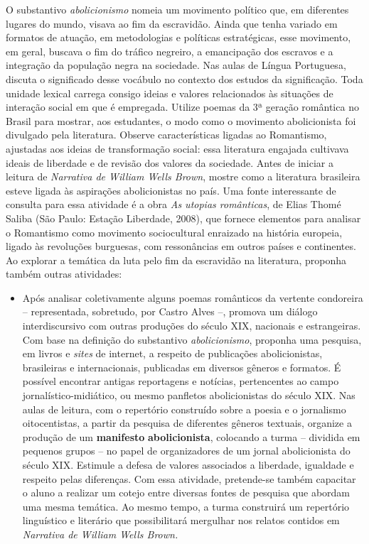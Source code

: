 \documentclass[11pt]{extarticle}
\begin{document}
O substantivo \emph{abolicionismo} nomeia um movimento
político que, em diferentes lugares do mundo, visava ao fim da
escravidão. Ainda que tenha variado em formatos de atuação, em
metodologias e políticas estratégicas, esse movimento, em geral, buscava
o fim do tráfico negreiro, a emancipação dos escravos e a integração da
população negra na sociedade. Nas aulas de Língua Portuguesa, discuta o
significado desse vocábulo no contexto dos estudos da significação. Toda
unidade lexical carrega consigo ideias e valores relacionados às
situações de interação social em que é empregada. Utilize poemas da 3ª
geração romântica no Brasil para mostrar, aos estudantes, o modo como o
movimento abolicionista foi divulgado pela literatura. Observe
características ligadas ao Romantismo, ajustadas aos ideias de
transformação social: essa literatura engajada cultivava ideais de
liberdade e de revisão dos valores da sociedade. Antes de iniciar a
leitura de \emph{Narrativa de William Wells Brown}, mostre como a
literatura brasileira esteve ligada às aspirações abolicionistas no
país. Uma fonte interessante de consulta para essa atividade é a obra
\emph{As utopias românticas}, de Elias Thomé Saliba (São Paulo: Estação
Liberdade, 2008), que fornece elementos para analisar o Romantismo como
movimento sociocultural enraizado na história europeia, ligado às
revoluções burguesas, com ressonâncias em outros países e continentes.
Ao explorar a temática da luta pelo fim da escravidão na literatura,
proponha também outras atividades:

\begin{itemize}
\item
  Após analisar coletivamente alguns poemas românticos da vertente
  condoreira -- representada, sobretudo, por Castro Alves --, promova um
  diálogo interdiscursivo com outras produções do século XIX, nacionais
  e estrangeiras. Com base na definição do substantivo
  \emph{abolicionismo}, proponha uma pesquisa, em livros e \emph{sites}
  de internet, a respeito de publicações abolicionistas, brasileiras e
  internacionais, publicadas em diversos gêneros e formatos. É possível
  encontrar antigas reportagens e notícias, pertencentes ao campo
  jornalístico-midiático, ou mesmo panfletos abolicionistas do século
  XIX. Nas aulas de leitura, com o repertório construído sobre a poesia
  e o jornalismo oitocentistas, a partir da pesquisa de diferentes
  gêneros textuais, organize a produção de um \textbf{manifesto}
  \textbf{abolicionista}, colocando a turma -- dividida em pequenos
  grupos -- no papel de organizadores de um jornal abolicionista do
  século XIX. Estimule a defesa de valores associados a liberdade,
  igualdade e respeito pelas diferenças. Com essa atividade, pretende-se
  também capacitar o aluno a realizar um cotejo entre diversas fontes de
  pesquisa que abordam uma mesma temática. Ao mesmo tempo, a turma
  construirá um repertório linguístico e literário que possibilitará
  mergulhar nos relatos contidos em \emph{Narrativa de William Wells
  Brown.}
\end{itemize}
\end{document}
